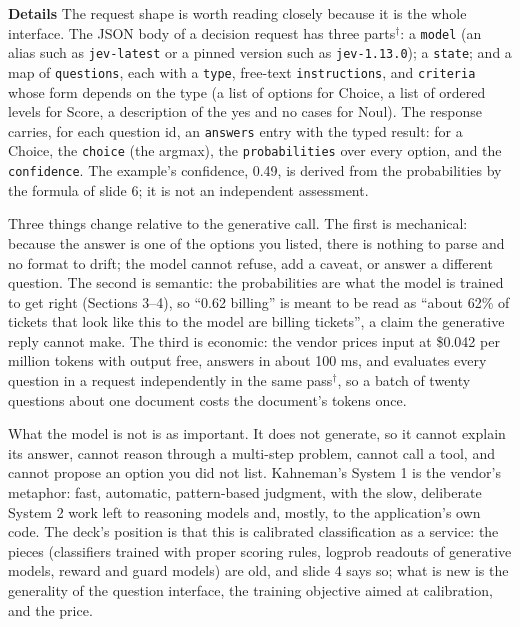 \documentclass[11pt,letterpaper]{article}
\newcommand{\para}[1]{\medskip\noindent\textbf{#1}\quad}
\begin{document}
\para{Details} The request shape is worth reading closely because it is the whole interface. The JSON body of a decision request has three parts$^\dagger$: a \texttt{model} (an alias such as \texttt{jev-latest} or a pinned version such as \texttt{jev-1.13.0}); a \texttt{state}; and a map of \texttt{questions}, each with a \texttt{type}, free-text \texttt{instructions}, and \texttt{criteria} whose form depends on the type (a list of options for Choice, a list of ordered levels for Score, a description of the yes and no cases for Noul). The response carries, for each question id, an \texttt{answers} entry with the typed result: for a Choice, the \texttt{choice} (the argmax), the \texttt{probabilities} over every option, and the \texttt{confidence}. The example's confidence, 0.49, is derived from the probabilities by the formula of slide 6; it is not an independent assessment.

Three things change relative to the generative call. The first is mechanical: because the answer is one of the options you listed, there is nothing to parse and no format to drift; the model cannot refuse, add a caveat, or answer a different question. The second is semantic: the probabilities are what the model is trained to get right (Sections 3--4), so ``0.62 billing'' is meant to be read as ``about 62\% of tickets that look like this to the model are billing tickets'', a claim the generative reply cannot make. The third is economic: the vendor prices input at \$0.042 per million tokens with output free, answers in about 100 ms, and evaluates every question in a request independently in the same pass$^\dagger$, so a batch of twenty questions about one document costs the document's tokens once.

What the model is not is as important. It does not generate, so it cannot explain its answer, cannot reason through a multi-step problem, cannot call a tool, and cannot propose an option you did not list. Kahneman's System 1 is the vendor's metaphor: fast, automatic, pattern-based judgment, with the slow, deliberate System 2 work left to reasoning models and, mostly, to the application's own code. The deck's position is that this is calibrated classification as a service: the pieces (classifiers trained with proper scoring rules, logprob readouts of generative models, reward and guard models) are old, and slide 4 says so; what is new is the generality of the question interface, the training objective aimed at calibration, and the price.
\end{document}
